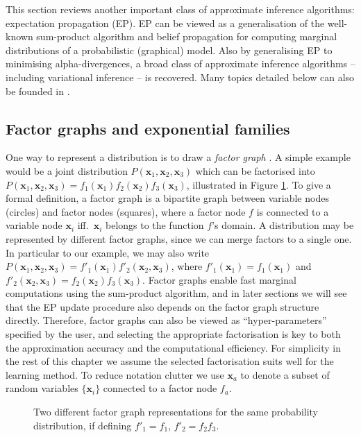 This section reviews another important class of approximate inference algorithms: expectation propagation (EP)\citep{minka:ep2001, opper:ec2005}. EP can be viewed as a generalisation of the well-known sum-product algorithm and belief propagation \citep{pearl:bp1982, pearl:book1988} for computing marginal distributions of a probabilistic (graphical) model. Also by generalising EP to minimising alpha-divergences, a broad class of approximate inference algorithms -- including variational inference -- is recovered. 
%
Many topics detailed below can also be founded in \citet{wainwright:graphical2008, koller:pgm2009}.


\subsection{Factor graphs and exponential families}

One way to represent a distribution is to draw a \emph{factor graph} \citep{kschischang:fg1998, kschischang:fg2001}. A simple example would be a joint distribution $P(\bm{x}_1, \bm{x}_2, \bm{x}_3)$ which can be factorised into $P(\bm{x}_1, \bm{x}_2, \bm{x}_3) = f_1(\bm{x}_1) f_2(\bm{x}_2) f_3(\bm{x}_3)$, illustrated in Figure \ref{fig:factor_graph}. To give a formal definition, a factor graph is a bipartite graph between variable nodes (circles) and factor nodes (squares), where a factor node $f$ is connected to a variable node $\bm{x}_i$ iff.~$\bm{x}_i$ belongs to the function $f$'s domain. A distribution may be represented by different factor graphs, since we can merge factors to a single one. In particular to our example, we may also write $P(\bm{x}_1, \bm{x}_2, \bm{x}_3) = f'_1(\bm{x}_1) f'_2(\bm{x}_2, \bm{x}_3)$, where $f'_1(\bm{x}_1) = f_1(\bm{x}_1)$ and $f'_2(\bm{x}_2, \bm{x}_3) = f_2(\bm{x}_2) f_3(\bm{x}_3)$. Factor graphs enable fast marginal computations using the sum-product algorithm, and in later sections we will see that the EP update procedure also depends on the factor graph structure directly. Therefore, factor graphs can also be viewed as ``hyper-parameters'' specified by the user, and selecting the appropriate factorisation is key to both the approximation accuracy and the computational efficiency. For simplicity in the rest of this chapter we assume the selected factorisation suits well for the learning method. To reduce notation clutter we use $\bm{x}_a$ to denote a subset of random variables $\{\bm{x}_i\}$ connected to a factor node $f_a$.

\begin{figure}
\centering
\subfigure[$P(\bm{x}_1, \bm{x}_2, \bm{x}_3) \propto f_1(\bm{x}_1) f_2(\bm{x}_2) f_3(\bm{x}_3)$]{
  }
\hspace{1.0in}%
\subfigure[$P(\bm{x}_1, \bm{x}_2, \bm{x}_3) \propto f'_1(\bm{x}_1) f'_2(\bm{x}_2, \bm{x}_3)$]{
  }
\caption{Two different factor graph representations for the same probability distribution, if defining $f'_1 = f_1$, $f'_2 = f_2 f_3$.}
  \label{fig:factor_graph} %
\end{figure} 
